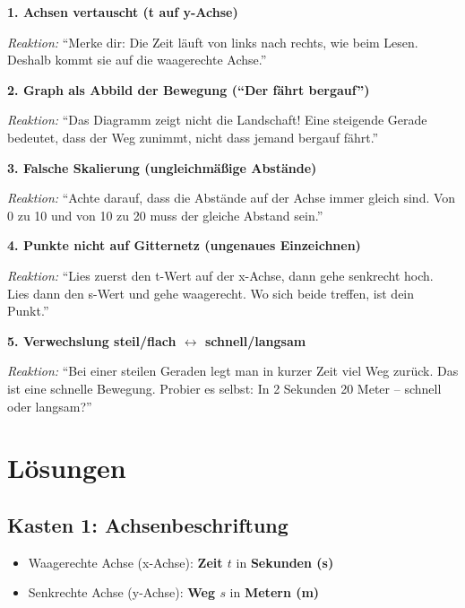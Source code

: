 \documentclass[11pt,a4paper]{article}
\begin{document}
\begin{fehlerbox}
\textbf{1. Achsen vertauscht (t auf y-Achse)}

\textit{Reaktion:} ``Merke dir: Die Zeit läuft von links nach rechts, wie beim Lesen. Deshalb kommt sie auf die waagerechte Achse.''

\vspace{0.5em}
\textbf{2. Graph als Abbild der Bewegung (``Der fährt bergauf'')}

\textit{Reaktion:} ``Das Diagramm zeigt nicht die Landschaft! Eine steigende Gerade bedeutet, dass der Weg zunimmt, nicht dass jemand bergauf fährt.''

\vspace{0.5em}
\textbf{3. Falsche Skalierung (ungleichmäßige Abstände)}

\textit{Reaktion:} ``Achte darauf, dass die Abstände auf der Achse immer gleich sind. Von 0 zu 10 und von 10 zu 20 muss der gleiche Abstand sein.''

\vspace{0.5em}
\textbf{4. Punkte nicht auf Gitternetz (ungenaues Einzeichnen)}

\textit{Reaktion:} ``Lies zuerst den t-Wert auf der x-Achse, dann gehe senkrecht hoch. Lies dann den s-Wert und gehe waagerecht. Wo sich beide treffen, ist dein Punkt.''

\vspace{0.5em}
\textbf{5. Verwechslung steil/flach $\leftrightarrow$ schnell/langsam}

\textit{Reaktion:} ``Bei einer steilen Geraden legt man in kurzer Zeit viel Weg zurück. Das ist eine schnelle Bewegung. Probier es selbst: In 2 Sekunden 20 Meter -- schnell oder langsam?''
\end{fehlerbox}

\section*{Lösungen}

\subsection*{Kasten 1: Achsenbeschriftung}
\begin{itemize}[leftmargin=2em]
    \item Waagerechte Achse (x-Achse): \textbf{Zeit $t$} in \textbf{Sekunden (s)}
    \item Senkrechte Achse (y-Achse): \textbf{Weg $s$} in \textbf{Metern (m)}
\end{itemize}
\end{document}

